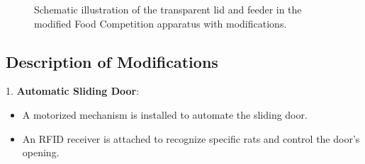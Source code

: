 \documentclass[english, a4paper, 11pt]{article}
\begin{document}
\begin{figure}[h]
    \centering
    \caption{Schematic illustration of the transparent lid and feeder in the modified Food Competition apparatus with modifications.}
    \label{fig:modified_apparatus_homecage_reality}
\end{figure}

\subsection*{Description of Modifications}

1. \textbf{Automatic Sliding Door}:
   \begin{itemize}
       \item A motorized mechanism is installed to automate the sliding door.
       \item An RFID receiver is attached to recognize specific rats and control the door's opening.
   \end{itemize}
\end{document}
